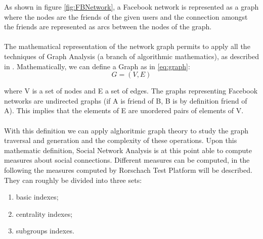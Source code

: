 As shown in figure \ref{fig:FBNetwork}, a Facebook network is represented as a graph where the nodes are the friends of the given users and the connection amongst the
friends are represented as arcs between the nodes of the graph.\\
\\
The mathematical representation of the network graph permits to apply all the techniques of Graph Analysis (a branch of algorithmic mathematics), as described in
\cite{Biggs-1999}.
Mathematically, we can deﬁne a Graph as in \ref{eq:graph}:\\

\begin{equation}
G = (V, E)
\label{eq:graph}
\end{equation}

where V is a set of nodes and E a set of edges.
The graphs representing Facebook networks are undirected graphs (if A is friend of B, B is by deﬁnition friend of A).
This implies that the elements of E are unordered pairs of elements of V.\\
\\
With this deﬁnition we can apply alghoritmic graph theory to study the graph traversal and generation and the complexity of these operations.
Upon this mathematic deﬁnition, Social Network Analysis is at this point able to compute measures about social connections.
Different measures can be computed, in the following the measures computed by Rorschach Test Platform will be described.
They can roughly be divided into three sets:
\begin{enumerate}
\item basic indexes;
\item centrality indexes;
\item subgroups indexes.
\end{enumerate}


